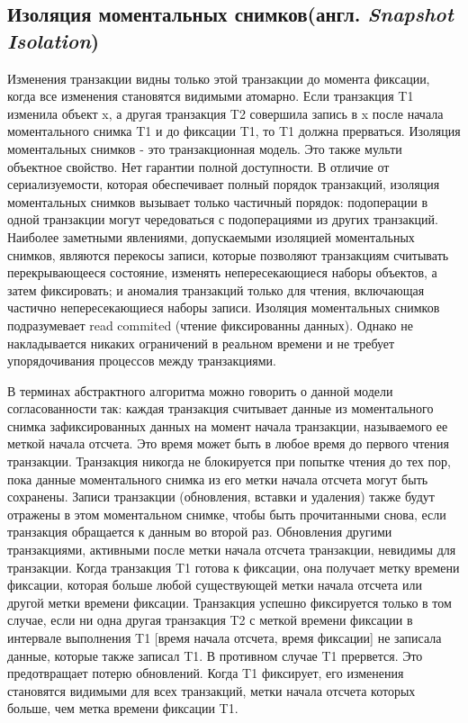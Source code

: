 \documentclass[12pt,  openany]{book}
\begin{document}
\subsection{Изоляция моментальных снимков(англ.  \textit{Snapshot Isolation})}
Изменения транзакции видны только этой транзакции до момента фиксации, когда все изменения становятся видимыми атомарно. Если транзакция T1 изменила объект x, а другая транзакция T2 совершила запись в x после начала моментального снимка T1 и до фиксации T1, то T1 должна прерваться.
Изоляция моментальных снимков - это транзакционная модель. Это также мульти объектное свойство.
Нет гарантии полной доступности. 
В отличие от сериализуемости, которая обеспечивает полный порядок транзакций, изоляция моментальных снимков вызывает только частичный порядок: подоперации в одной транзакции могут чередоваться с подоперациями из других транзакций. Наиболее заметными явлениями, допускаемыми изоляцией моментальных снимков, являются перекосы записи, которые позволяют транзакциям считывать перекрывающееся состояние, изменять непересекающиеся наборы объектов, а затем фиксировать; и аномалия транзакций только для чтения, включающая частично непересекающиеся наборы записи.
Изоляция моментальных снимков подразумевает read commited (чтение фиксированны данных). Однако не накладывается никаких ограничений в реальном времени и не требует упорядочивания процессов между транзакциями.
\par
В терминах абстрактного алгоритма можно говорить о данной модели согласованности так: каждая транзакция считывает данные из моментального снимка зафиксированных данных на момент начала транзакции, называемого ее меткой начала отсчета. Это время может быть в любое время до первого чтения транзакции. Транзакция никогда не блокируется при попытке чтения до тех пор, пока данные моментального снимка из его метки начала отсчета могут быть сохранены. Записи транзакции (обновления, вставки и удаления) также будут отражены в этом моментальном снимке, чтобы быть прочитанными снова, если транзакция обращается к данным во второй раз. Обновления другими транзакциями, активными после метки начала отсчета транзакции, невидимы для транзакции. 
Когда транзакция T1 готова к фиксации, она получает метку времени фиксации, которая больше любой существующей метки начала отсчета или другой метки времени фиксации. Транзакция успешно фиксируется только в том случае, если ни одна другая транзакция T2 с меткой времени фиксации в интервале выполнения T1 [время начала отсчета, время фиксации] не записала данные, которые также записал T1. В противном случае T1 прервется. Это предотвращает потерю обновлений. Когда T1 фиксирует, его изменения становятся видимыми для всех транзакций, метки начала отсчета которых больше, чем метка времени фиксации T1.
\end{document}
